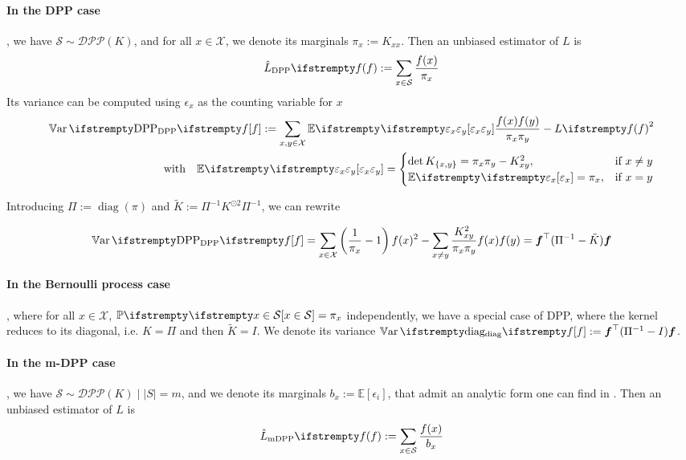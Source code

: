 \paragraph{In the DPP case}, we have $ \mathcal S \sim \mathcal{DPP}(K)$, and for all $x \in \mathcal{X}$, we denote its marginals $\pi_x := K_{xx}$. Then an unbiased estimator of $L$ is
\begin{equation*}
	\estloss{\textrm{DPP}}{\query} := \sum_{x\in \mathcal S} \frac{\query(x)}{\pi_x}
\end{equation*}
Its variance can be computed using $\epsilon_x$ as the counting variable for $x$
\begin{align*}
	\Var{\textrm{DPP}}{\query}
:=\sum_{x,y \in \mathcal{X}}\EE{}{\epsilon_{x} \epsilon_{y}} \frac{\query(x) \query(y)} {\pi_{x} \pi_{y}}  - \loss{\query}^{2}\\
\quad \text{with} \quad
\EE{}{\epsilon_{x} \epsilon_{y}}=
\begin{cases}
	\det K_{\{x, y\}}=\pi_{x} \pi_{y}-K_{xy}^{2}, & \text{if } x \neq y \\
	\EE{}{\epsilon_{x}}=\pi_{x},&\text{if } x = y
\end{cases}
\end{align*}



Introducing $\Pi := \operatorname{diag}(\pi)$ and $\tilde K := \Pi^{-1}K^{\odot 2} \Pi^{-1}$, we can rewrite  

\begin{equation}
	\Var{\textrm{DPP}}{\query}=\sum_{x \in \mathcal{X}}\left(\frac{1}{\pi_{x}}-1\right) \query(x)^{2}-\sum_{x \neq y} \frac{K_{xy}^{2}}{\pi_{x} \pi_{y}} \query(x) \query(y) =  \boldsymbol\query\T (\Pi^{-1}  - \tilde{K}) \boldsymbol\query 
\end{equation}

\paragraph{In the Bernoulli process case}, where for all $x \in \mathcal{X}$, $\PP{}{x \in \mathcal S} = \pi_x$ independently, we have a special case of DPP, where the kernel reduces to its diagonal, i.e. $K = \Pi$ and then $\tilde K = I$. We denote its variance $\Var{\textrm{diag}}{f} := \boldsymbol\query\T (\Pi^{-1}  - I) \boldsymbol\query $.


\paragraph{In the m-DPP case}, we have $\mathcal S \sim \mathcal{DPP}(K) \mid |S|=m$, and we denote its marginals $b_{x} := \mathbb{E}\left[\epsilon_{i}\right]$, that admit an analytic form one can find in \cite{kulesza2012_dpp_for_ml}. Then an unbiased estimator of $L$ is
\begin{equation*}
	\estloss{\textrm{mDPP}}{\query} := \sum_{x\in \mathcal S} \frac{\query(x)}{b_x}
\end{equation*}

